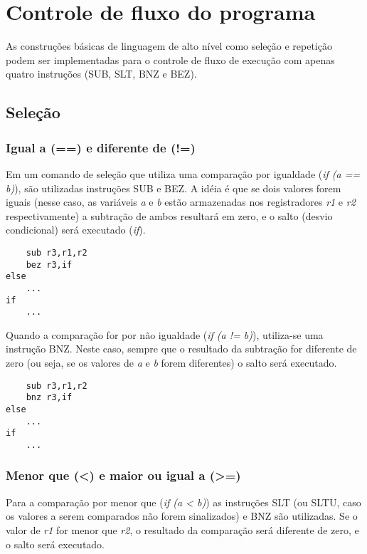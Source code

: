 \documentclass{extreport}
\begin{document}
\section{Controle de fluxo do programa}

As construções básicas de linguagem de alto nível como seleção e repetição podem ser implementadas para o controle de fluxo de execução com apenas quatro instruções (SUB, SLT, BNZ e BEZ).

\subsection{Seleção}

\subsubsection{Igual a (==) e diferente de (!=)}

Em um comando de seleção que utiliza uma comparação por igualdade (\textit{if (a == b)}), são utilizadas instruções SUB e BEZ. A idéia é que se dois valores forem iguais (nesse caso, as variáveis \textit{a} e \textit{b} estão armazenadas nos registradores \textit{r1} e \textit{r2} respectivamente) a subtração de ambos resultará em zero, e o salto (desvio condicional) será executado (\textit{if}).

\begin{verbatim}
    sub r3,r1,r2
    bez r3,if
else
    ...
if
    ...
\end{verbatim}

Quando a comparação for por não igualdade (\textit{if (a != b)}), utiliza-se uma instrução BNZ. Neste caso, sempre que o resultado da subtração for diferente de zero (ou seja, se os valores de \textit{a} e \textit{b} forem diferentes) o salto será executado.

\begin{verbatim}
    sub r3,r1,r2
    bnz r3,if
else
    ...
if
    ...
\end{verbatim}

\subsubsection{Menor que (<) e maior ou igual a (>=)}

Para a comparação por menor que (\textit{if (a < b)}) as instruções SLT (ou SLTU, caso os valores a serem comparados não forem sinalizados) e BNZ são utilizadas. Se o valor de \textit{r1} for menor que \textit{r2}, o resultado da comparação será diferente de zero, e o salto será executado.
\end{document}
